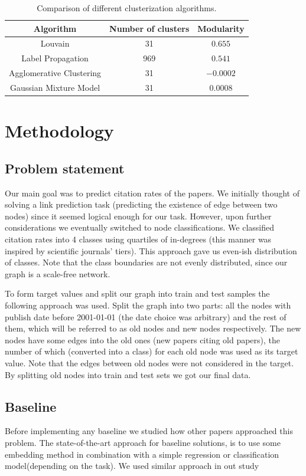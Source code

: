\documentclass{article}
\newcommand\tab[1][1cm]{\hspace*{#1}}
\begin{document}
\begin{table}[h]
\centering
\begin{tabular}{c c c}
\hline\hline
Algorithm & Number of clusters & Modularity \\
\hline
Louvain & 31 & $0.655$ \\
Label Propagation & 969 & $0.541$ \\
Agglomerative Clustering & 31 & $-0.0002$ \\
Gaussian Mixture Model & 31 & $0.0008$ \\
\hline
\end{tabular}
\caption{Comparison of different clusterization algorithms.}
\label{table:clusterization}
\end{table}

\section{Methodology}
\subsection{Problem statement}
\tab Our main goal was to predict citation rates of the papers. We initially thought of solving a link prediction task (predicting the existence of edge between two nodes) since it seemed logical enough for our task. However, upon further considerations we eventually switched to node classifications. We classified citation rates into 4 classes using quartiles of in-degrees (this manner was inspired by scientific journals' tiers). This approach gave us even-ish distribution of classes. Note that the class boundaries are not evenly distributed, since our graph is a scale-free network.

To form target values and split our graph into train and test samples the following approach was used. Split the graph into two parts: all the nodes with publish date before 2001-01-01 (the date choice was arbitrary) and the rest of them, which will be referred to as old nodes and new nodes respectively. The new nodes have some edges into the old ones (new papers citing old papers), the number of which (converted into a class) for each old node was used as its target value. Note that the edges between old nodes were not considered in the target. By splitting old nodes into train and test sets we got our final data.

\subsection{Baseline}
\tab Before implementing any baseline we studied how other papers approached this problem. The state-of-the-art approach for baseline solutions, is to use some embedding method in combination with a simple regression or classification model(depending on the task). We used similar approach in out study
\end{document}
